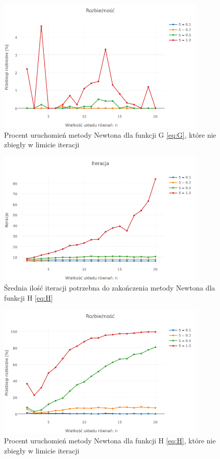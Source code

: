 \documentclass[11pt,wide]{mwart}
\begin{document}
\begin{figure}[h]
    \centering
    \includegraphics[width=0.9\textwidth]{avg_diversions_G}
    \caption{Procent uruchomień metody Newtona dla funkcji G \eqref{eq:G}, które nie zbiegły w limicie iteracji}
    \label{fig:avgdiversionsG}
\end{figure}

\begin{figure}[h]
    \centering
    \includegraphics[width=0.9\textwidth]{avg_iterations_H}
    \caption{Średnia ilość iteracji potrzebna do zakończenia metody Newtona dla funkcji H \eqref{eq:H}}
    \label{fig:avgiterationsH}
\end{figure}

\begin{figure}[h]
    \centering
    \includegraphics[width=0.9\textwidth]{avg_diversions_H}
    \caption{Procent uruchomień metody Newtona dla funkcji H \eqref{eq:H}, które nie zbiegły w limicie iteracji}
    \label{fig:avgdiversionsH}
\end{figure}
\end{document}
